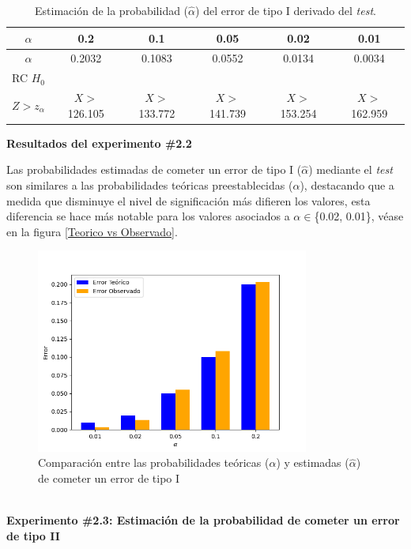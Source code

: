 \documentclass[12pt]{report}
\begin{document}
\begin{table}[h!]
	\centering
	\begin{tabular}{|c|ccccc|}
		\hline
		$\alpha$ &  0.2 & 0.1 & 0.05 & 0.02 &  0.01 \\
		\hline
		$\hat{\alpha}$ & 0.2032 & 0.1083 & 0.0552 & 0.0134 & 0.0034 \\
		\hline
		RC $H_0$  &		&				&			&			&\\
		$Z>z_\alpha$&$X>$126.105& $X>$133.772& $X>$141.739& $X>$153.254& $X>$162.959 \\
		\hline
	\end{tabular}
	\caption{Estimación de la probabilidad ($\hat{\alpha}$) del error de tipo I derivado del \textit{test}.}
	\label{tab:error1-prob1}
\end{table}

\textbf{Resultados del experimento \#2.2}

Las probabilidades estimadas de cometer un error de tipo I ($\hat{\alpha}$) mediante el \textit{test} son similares a las probabilidades teóricas preestablecidas ($\alpha$), destacando que a medida que disminuye el nivel de significación más difieren los valores, esta diferencia se hace más notable para los valores asociados a $\alpha \in$\{0.02, 0.01\}, véase en la figura \ref{Teorico vs Observado}.
\begin{figure}[ht]
	\centering
	
	\includegraphics[width=0.8\textwidth]{4td_teo_obs.png}
	\caption{Comparación entre las probabilidades teóricas ($\alpha$) y estimadas ($\hat{\alpha}$) de cometer un error de tipo I }
	\label{Teorico vs Observado1}
\end{figure}\\

\textbf{Experimento \#2.3: Estimación de la probabilidad de cometer un error de tipo II}
\end{document}
